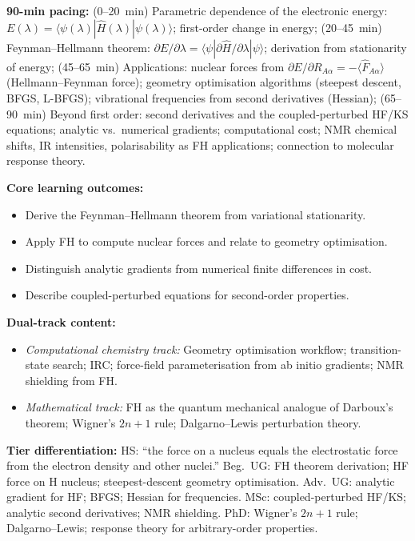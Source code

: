 \documentclass[11pt,a4paper]{article}
\begin{document}
\begin{tcolorbox}[chembox, title={Module~III.1 / L03: Parametric Dependence and the Feynman--Hellmann Theorem}]
\textbf{90-min pacing:} (0--20~min) Parametric dependence of the electronic energy: $E(\lambda)=\langle\psi(\lambda)|\hat{H}(\lambda)|\psi(\lambda)\rangle$; first-order change in energy; (20--45~min) Feynman--Hellmann theorem: $\partial E/\partial\lambda=\langle\psi|\partial\hat{H}/\partial\lambda|\psi\rangle$; derivation from stationarity of energy; (45--65~min) Applications: nuclear forces from $\partial E/\partial R_{A\alpha}=-\langle\hat{F}_{A\alpha}\rangle$ (Hellmann--Feynman force); geometry optimisation algorithms (steepest descent, BFGS, L-BFGS); vibrational frequencies from second derivatives (Hessian); (65--90~min) Beyond first order: second derivatives and the coupled-perturbed HF/KS equations; analytic vs.\ numerical gradients; computational cost; NMR chemical shifts, IR intensities, polarisability as FH applications; connection to molecular response theory.

\medskip\textbf{Core learning outcomes:}
\begin{itemize}[leftmargin=1.4em,topsep=2pt,itemsep=1pt]
  \item Derive the Feynman--Hellmann theorem from variational stationarity.
  \item Apply FH to compute nuclear forces and relate to geometry optimisation.
  \item Distinguish analytic gradients from numerical finite differences in cost.
  \item Describe coupled-perturbed equations for second-order properties.
\end{itemize}

\medskip\textbf{Dual-track content:}
\begin{itemize}[leftmargin=1.4em,topsep=2pt,itemsep=1pt]
  \item \textit{Computational chemistry track:} Geometry optimisation workflow; transition-state search; IRC; force-field parameterisation from ab initio gradients; NMR shielding from FH.
  \item \textit{Mathematical track:} FH as the quantum mechanical analogue of Darboux's theorem; Wigner's $2n+1$ rule; Dalgarno--Lewis perturbation theory.
\end{itemize}

\medskip\textbf{Tier differentiation:}
HS: ``the force on a nucleus equals the electrostatic force from the electron density and other nuclei.''
Beg.\ UG: FH theorem derivation; HF force on H nucleus; steepest-descent geometry optimisation.
Adv.\ UG: analytic gradient for HF; BFGS; Hessian for frequencies.
MSc: coupled-perturbed HF/KS; analytic second derivatives; NMR shielding.
PhD: Wigner's $2n+1$ rule; Dalgarno--Lewis; response theory for arbitrary-order properties.


\end{tcolorbox}
\end{document}
